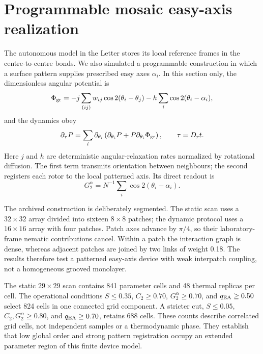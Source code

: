 \documentclass[aps,prl,onecolumn,superscriptaddress,nofootinbib]{revtex4-2}
\begin{document}
\section{Programmable mosaic easy-axis realization}

The autonomous model in the Letter stores its local reference frames in the
centre-to-centre bonds.  We also simulated a programmable construction in
which a surface pattern supplies prescribed easy axes \(\alpha_i\).  In this
section only, the dimensionless angular potential is
\begin{equation}
 \Phi_{\rm gr}=-j\sum_{(ij)}w_{ij}\cos2(\theta_i-\theta_j)
 -h\sum_i\cos2(\theta_i-\alpha_i),
 \label{eq:supp-groove-potential}
\end{equation}
and the dynamics obey
\begin{equation}
 \partial_\tau P=\sum_i\partial_{\theta_i}
 \left(\partial_{\theta_i}P+P\partial_{\theta_i}\Phi_{\rm gr}\right),
 \qquad \tau=D_rt.
 \label{eq:supp-groove-smol}
\end{equation}
Here \(j\) and \(h\) are deterministic angular-relaxation rates normalized by
rotational diffusion.  The first term transmits orientation
between neighbours; the second registers each rotor to the local patterned
axis.  Its direct readout is
\begin{equation}
 G_2^{\alpha}=N^{-1}\sum_i\cos2(\theta_i-\alpha_i).
 \label{eq:supp-groove-registration}
\end{equation}

The archived construction is deliberately segmented.  The static scan uses
a \(32\times32\) array divided into sixteen \(8\times8\) patches; the dynamic
protocol uses a \(16\times16\) array with four patches.  Patch axes advance by
\(\pi/4\), so their laboratory-frame nematic contributions cancel.  Within a
patch the interaction graph is dense, whereas adjacent patches are joined by
two links of weight 0.18.  The results therefore test a patterned
easy-axis device with weak interpatch coupling, not a homogeneous grooved
monolayer.

The static \(29\times29\) scan contains 841 parameter cells and 48 thermal
replicas per cell.  The operational conditions
\(S\leq0.35\), \(C_2\geq0.70\), \(G_2^{\alpha}\geq0.70\), and
\(q_{\rm EA}\geq0.50\) select 824 cells in one connected grid component.  A
stricter cut, \(S\leq0.05\), \(C_2,G_2^{\alpha}\geq0.80\), and
\(q_{\rm EA}\geq0.70\), retains 688 cells.  These counts describe correlated
grid cells, not independent samples or a thermodynamic phase.  They establish
that low global order and strong pattern registration occupy an extended
parameter region of this finite device model.
\end{document}
